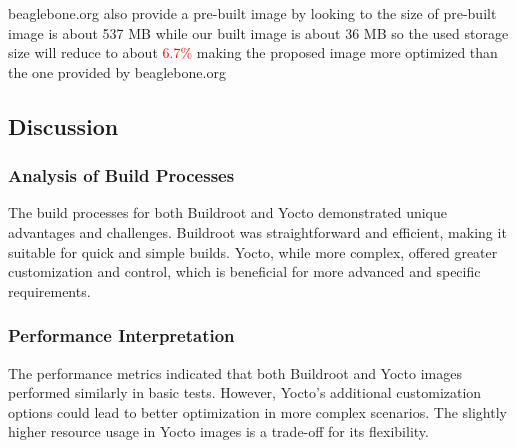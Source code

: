 beaglebone.org also provide a pre-built image by looking to the size of pre-built image is about 537 MB while our built image is about 36 MB so the used storage size will reduce to about \textcolor{red}{6.7\%} making the proposed image more optimized than the one provided by beaglebone.org


\subsection{Discussion}

\subsubsection{Analysis of Build Processes}
The build processes for both Buildroot and Yocto demonstrated unique advantages and challenges. Buildroot was straightforward and efficient, making it suitable for quick and simple builds. Yocto, while more complex, offered greater customization and control, which is beneficial for more advanced and specific requirements.

\subsubsection{Performance Interpretation}
The performance metrics indicated that both Buildroot and Yocto images performed similarly in basic tests. However, Yocto's additional customization options could lead to better optimization in more complex scenarios. The slightly higher resource usage in Yocto images is a trade-off for its flexibility.

